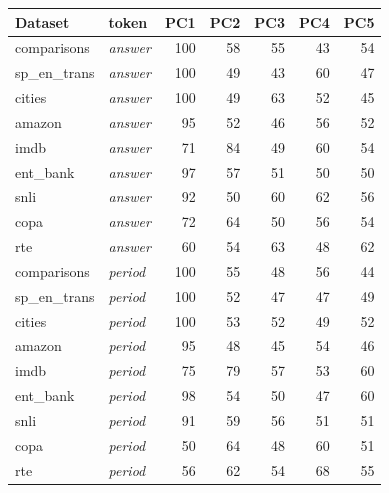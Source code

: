     \begin{tabular}{llrrrrr}
    \toprule
    Dataset & token & PC1 & PC2 & PC3 & PC4 & PC5 \\
    \midrule
    comparisons & \textit{answer} & 100 & 58 & 55 & 43 & 54 \\
    sp\_en\_trans & \textit{answer} & 100 & 49 & 43 & 60 & 47 \\
    cities & \textit{answer} & 100 & 49 & 63 & 52 & 45 \\
    amazon & \textit{answer} & 95 & 52 & 46 & 56 & 52 \\
    imdb & \textit{answer} & 71 & 84 & 49 & 60 & 54 \\
    ent\_bank & \textit{answer} & 97 & 57 & 51 & 50 & 50 \\
    snli & \textit{answer} & 92 & 50 & 60 & 62 & 56 \\
    copa & \textit{answer} & 72 & 64 & 50 & 56 & 54 \\
    rte & \textit{answer} & 60 & 54 & 63 & 48 & 62 \\
    \midrule
    comparisons & \textit{period} & 100 & 55 & 48 & 56 & 44 \\
    sp\_en\_trans & \textit{period} & 100 & 52 & 47 & 47 & 49 \\
    cities & \textit{period} & 100 & 53 & 52 & 49 & 52 \\
    amazon & \textit{period} & 95 & 48 & 45 & 54 & 46 \\
    imdb & \textit{period} & 75 & 79 & 57 & 53 & 60 \\
    ent\_bank & \textit{period} & 98 & 54 & 50 & 47 & 60 \\
    snli & \textit{period} & 91 & 59 & 56 & 51 & 51 \\
    copa & \textit{period} & 50 & 64 & 48 & 60 & 51 \\
    rte & \textit{period} & 56 & 62 & 54 & 68 & 55 \\
    \bottomrule
    \end{tabular}

